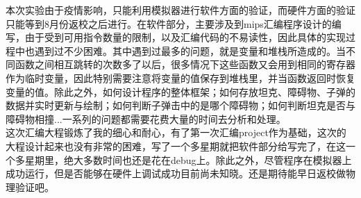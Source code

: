 本次实验由于疫情影响，只能利用模拟器进行软件方面的验证，而硬件方面的验证只能等到8月份返校之后进行。在软件部分，主要涉及到mips汇编程序设计的编写，由于受到可用指令数量的限制，以及汇编代码的不易读性，因此具体的实现过程中也遇到过不少困难。其中遇到过最多的问题，就是变量和堆栈所造成的。当不同函数之间相互跳转的次数多了以后，很多情况下这些函数又会用到相同的寄存器作为临时变量，因此特别需要注意将变量的值保存到堆栈里，并当函数返回时恢复变量的值。除此之外，如何设计程序的整体框架；如何存放坦克、障碍物、子弹的数据并实时更新与绘制；如何判断子弹击中的是哪个障碍物；如何判断坦克是否与障碍物相撞...一系列的问题都需要花费大量的时间去分析和处理。\\

这次汇编大程锻炼了我的细心和耐心，有了第一次汇编project作为基础，这次的大程设计起来也没有非常的困难，写了一个多星期就把软件部分给写完了，在这一个多星期里，绝大多数时间也还是花在debug上。除此之外，尽管程序在模拟器上成功运行，但是否能够在硬件上调试成功目前尚未知晓。还是期待能早日返校做物理验证吧。\\